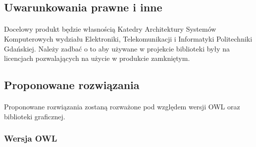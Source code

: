 \subsection{Uwarunkowania prawne i inne}
\paragraph{} Docelowy produkt będzie własnością Katedry Architektury Systemów Komputerowych wydziału Elektroniki, Telekomunikacji i Informatyki Politechniki Gdańskiej.  Należy zadbać  o to aby używane w projekcie biblioteki były na licencjach pozwalających na użycie w produkcie zamkniętym.


\subsection{Proponowane rozwiązania}

\paragraph{} Proponowane rozwiązania zostaną rozważone pod względem wersji OWL oraz biblioteki graficznej.

\subsubsection{Wersja OWL}

